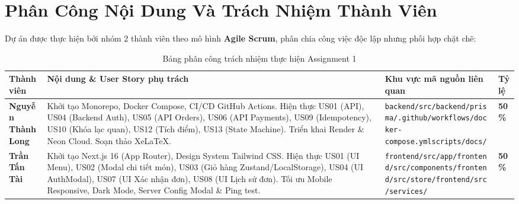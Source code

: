 \documentclass[12pt, a4paper]{article}
\newcommand{\fpath}[1]{\nolinkurl{#1}}
\begin{document}
\clearpage
\section{Phân Công Nội Dung Và Trách Nhiệm Thành Viên}

Dự án được thực hiện bởi nhóm 2 thành viên theo mô hình \textbf{Agile Scrum}, phân chia công việc độc lập nhưng phối hợp chặt chẽ:

\begin{table}[H]
\centering
\small
{}
\begin{tabularx}{\textwidth}{@{}L{3.1cm} Y L{4.0cm} C{1.2cm}@{}}
\color{white}\textbf{Thành viên} & \color{white}\textbf{Nội dung \& User Story phụ trách} & \color{white}\textbf{Khu vực mã nguồn liên quan} & \color{white}\textbf{Tỷ lệ} \\
\midrule
\textbf{Nguyễn Thành Long} &
Khởi tạo Monorepo, Docker Compose, CI/CD GitHub Actions. Hiện thực US01 (API), US04 (Backend Auth), US05 (API Orders), US06 (API Payments), US09 (Idempotency), US10 (Khóa lạc quan), US12 (Tích điểm), US13 (State Machine). Triển khai Render \& Neon Cloud. Soạn thảo XeLaTeX. &
\fpath{backend/src/}\newline \fpath{backend/prisma/}\newline \fpath{.github/workflows/}\newline \fpath{docker-compose.yml}\newline \fpath{scripts/}\newline \fpath{docs/} & \textbf{50\%} \\
\textbf{Trần Tấn Tài} &
Khởi tạo Next.js 16 (App Router), Design System Tailwind CSS. Hiện thực US01 (UI Menu), US02 (Modal chi tiết món), US03 (Giỏ hàng Zustand/LocalStorage), US04 (UI AuthModal), US07 (UI Xác nhận đơn), US08 (UI Lịch sử đơn). Tối ưu Mobile Responsive, Dark Mode, Server Config Modal \& Ping test. &
\fpath{frontend/src/app/}\newline \fpath{frontend/src/components/}\newline \fpath{frontend/src/store/}\newline \fpath{frontend/src/services/} & \textbf{50\%} \\
\bottomrule
\end{tabularx}
\caption{Bảng phân công trách nhiệm thực hiện Assignment 1}
\end{table}
\end{document}
